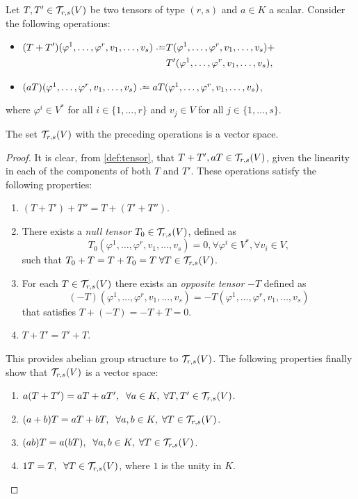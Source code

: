 \begin{theorem}
	Let $T, T' \in {\mathcal T}_{r,s}(V)$ be two tensors of type $(r,s)$ and $a \in K$ a scalar. Consider the following operations:
	\begin{itemize}
		\item $\begin{aligned}[t]
			(T+T') (\varphi^1, \dots, \varphi^r, v_1, \dots, v_s) \defeq &T(\varphi^1, \dots, \varphi^r, v_1, \dots, v_s) +\\
			&T'(\varphi^1, \dots, \varphi^r, v_1, \dots, v_s),
		\end{aligned}$
		\item $(a T)(\varphi^1, \dots, \varphi^r, v_1, \dots, v_s) \defeq a T(\varphi^1, \dots, \varphi^r, v_1, \dots, v_s)$,
	\end{itemize}
	where $\varphi^i \in V^*$ for all $i \in \{1,\dots,r\}$ and $v_j \in V$ for all $j \in \{1,\dots,s\}$.

	The set ${\mathcal T}_{r,s}(V)$ with the preceding operations is a vector space.
\end{theorem}

\begin{proof}
	It is clear, from \autoref{def:tensor}, that $T+T', aT \in {\mathcal T}_{r,s}(V)$, given the linearity in each of the components of both $T$ and $T'$.
	These operations satisfy the following properties:
	\begin{enumerate}
		\item $(T+T') + T'' = T + (T'+T'')$.
		\item There exists a \emph{null tensor} $T_0 \in {\mathcal T}_{r,s}(V)$, defined as \[T_0(\varphi^1, \dots, \varphi^r, v_1, \dots, v_s) = 0, \forall \varphi^i \in V^*, \forall v_i \in V,\] such that $T_0 + T = T + T_0 = T \;\forall T \in {\mathcal T}_{r,s}(V)$.
		\item For each $T\in{\mathcal T}_{r,s}(V)$ there exists an \emph{opposite tensor} $-T$ defined as \[(-T)(\varphi^1, \dots, \varphi^r, v_1, \dots, v_s) = - T(\varphi^1, \dots, \varphi^r, v_1, \dots, v_s)\] that satisfies $T + (-T) = -T + T = 0$.
		\item $T + T' = T' + T$.
	\end{enumerate}
	This provides abelian group structure to ${\mathcal T}_{r,s}(V)$. The following properties finally show that ${\mathcal T}_{r,s}(V)$ is a vector space:
	\begin{enumerate}
		\item $a(T+T') = aT+ aT', \;\;\forall a \in K, \;\forall T,T' \in {\mathcal T}_{r,s}(V)$.
		\item $(a+b)T = aT + bT, \;\;\forall a,b \in K, \;\forall T \in {\mathcal T}_{r,s}(V)$.
		\item $(ab)T = a(bT), \;\;\forall a,b \in K, \;\forall T \in {\mathcal T}_{r,s}(V)$.
		\item $1T = T, \;\;\forall T \in {\mathcal T}_{r,s}(V)$, where $1$ is the unity in $K$.
	\end{enumerate}
\end{proof}

